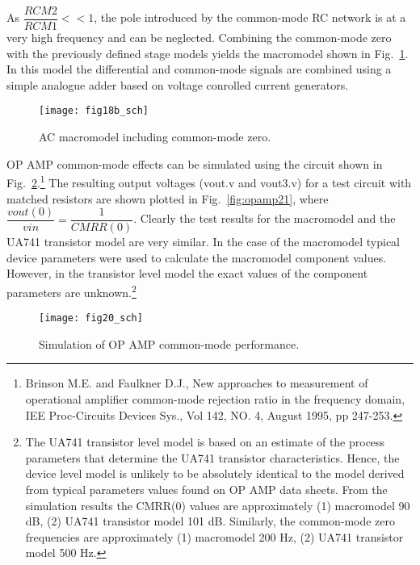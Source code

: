 As $\dfrac{RCM2}{RCM1} << 1$, the pole introduced by the common-mode RC network is at a very high frequency and can be neglected. Combining the common-mode zero with the previously defined stage models yields the macromodel shown in Fig.~\ref{fig:opamp18b}.  In this model the differential and common-mode signals are combined using a simple analogue adder based on voltage conrolled current generators.

\begin{figure}
  \centering
  \texttt{[image: fig18b\_sch]}
  \caption{AC macromodel including common-mode zero.}
  \label{fig:opamp18b}
\end{figure}

OP AMP common-mode effects can be simulated using the circuit shown in Fig.~\ref{fig:opamp20}.\footnote{Brinson M.E. and Faulkner D.J., New approaches to measurement of operational amplifier common-mode rejection ratio in the frequency domain, IEE Proc-Circuits Devices Sys., Vol 142, NO. 4, August 1995, pp 247-253.} The resulting output voltages (vout.v and vout3.v) for a test circuit with matched resistors are shown plotted in Fig.~\ref{fig:opamp21}, where
$\dfrac{vout(0)}{vin}=\dfrac{1}{CMRR(0)}$.  Clearly the test results for the macromodel and the UA741 transistor model are very similar.  In the case of the macromodel typical device parameters were used to calculate the macromodel component values.  However, in the transistor level model the exact values of the component parameters are unknown.\footnote{The UA741 transistor level model is based on an estimate of the process parameters that determine the UA741 transistor characteristics.  Hence, the device level model is unlikely to be absolutely identical to the model derived from typical parameters values found on OP AMP data sheets. From the simulation results the CMRR(0) values are approximately (1) macromodel 90 dB, (2) UA741 transistor model 101 dB. Similarly, the common-mode zero frequencies are approximately (1) macromodel 200 Hz, (2) UA741 transistor model 500 Hz.}

\begin{figure}
  \centering
  \texttt{[image: fig20\_sch]}
  \caption{Simulation of OP AMP common-mode performance.}
  \label{fig:opamp20}
\end{figure}

